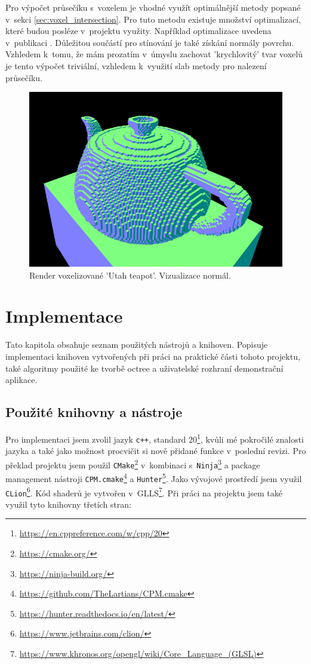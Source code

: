 Pro výpočet průsečíku s~voxelem je vhodné využít optimálnější metody popsané v~sekci \ref{sec:voxel_intersection}. Pro tuto metodu existuje množství optimalizací, které budou posléze v~projektu využity. Například optimalizace uvedena v~publikaci \cite{Majercik2018Voxel}. Důležitou součástí pro stínování je také získání normály povrchu. Vzhledem k~tomu, že mám prozatím v~úmyslu zachovat 'krychlovitý' tvar voxelů je tento výpočet triviální, vzhledem k~využití slab metody pro nalezení průsečíku.

\begin{figure}[H]
	\centering
	\includegraphics[scale=1]{obrazky-figures/normals_teapot.png}
	\caption{Render voxelizované 'Utah teapot'. Vizualizace normál. }
	\label{fig:octree_child}
\end{figure}




\chapter{Implementace}
\label{implementace}

Tato kapitola obsahuje seznam použitých nástrojů a knihoven. Popisuje implementaci knihoven vytvořených při práci na praktické části tohoto projektu, také algoritmy použité ke tvorbě octree a uživatelské rozhraní demonstrační aplikace.

\section{Použité knihovny a nástroje}
Pro implementaci jsem zvolil jazyk \texttt{c++}, standard 20\footnote{\url{https://en.cppreference.com/w/cpp/20}}, kvůli mé pokročilé znalosti jazyka a také jako možnost procvičit si nově přidané funkce v~poslední revizi. Pro překlad projektu jsem použil \texttt{CMake}\footnote{\url{https://cmake.org/}} v~kombinaci s~\texttt{Ninja}\footnote{\url{https://ninja-build.org/}} a package management nástroji \texttt{CPM.cmake}\footnote{\url{https://github.com/TheLartians/CPM.cmake}} a \texttt{Hunter}\footnote{\url{https://hunter.readthedocs.io/en/latest/}}. Jako vývojové prostředí jsem využil \texttt{CLion}\footnote{\url{https://www.jetbrains.com/clion/}}. Kód shaderů je vytvořen v~GLLS\footnote{\url{https://www.khronos.org/opengl/wiki/Core_Language_(GLSL)}}. Při práci na projektu jsem také využil tyto knihovny třetích stran:


